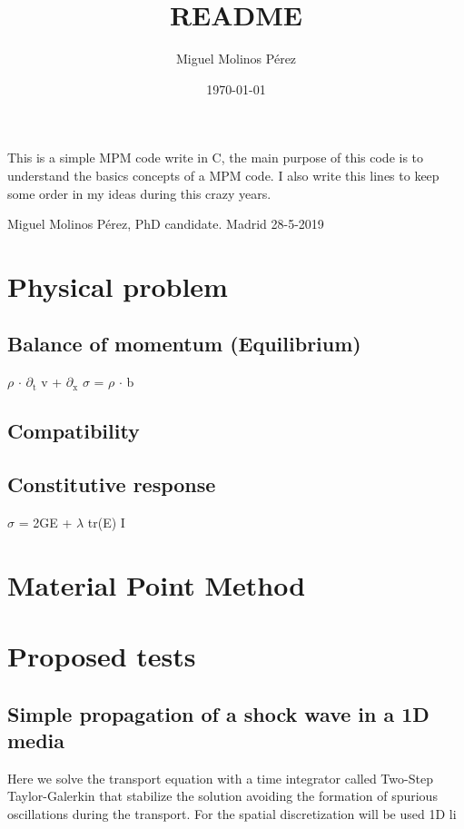 \documentclass[11pt]{article}
\author{Miguel Molinos Pérez}
\date{\today}
\title{README}
\begin{document}
\maketitle
\tableofcontents


This is a simple MPM code write in C, the main purpose of this code is to understand the basics concepts of a MPM code. I also write this lines to keep some order in my ideas during this crazy years. 

Miguel Molinos Pérez, PhD candidate. Madrid 28-5-2019

\section{Physical problem}
\label{sec-1}

\subsection{Balance of momentum (Equilibrium)}
\label{sec-1-1}

$\rho$ $\cdot$ $\partial$$_{\text{t}}$ v + $\partial$$_{\text{x}}$ $\sigma$ =  $\rho$ $\cdot$ b

\subsection{Compatibility}
\label{sec-1-2}


\subsection{Constitutive response}
\label{sec-1-3}

$\sigma$ = 2GE + $\lambda$ tr(E) I


\section{Material Point Method}
\label{sec-2}

\section{Proposed tests}
\label{sec-3}

\subsection{Simple propagation of a shock wave in a 1D media}
\label{sec-3-1}

Here we solve the transport equation with a time integrator called Two-Step Taylor-Galerkin that stabilize the solution avoiding the formation of spurious oscillations during the transport. For the spatial discretization will be used 1D li
\end{document}

